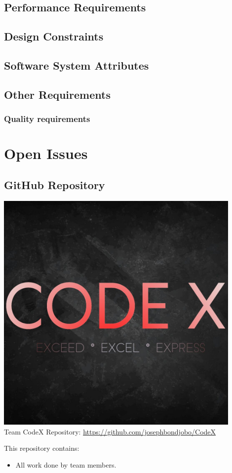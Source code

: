 \documentclass[a4paper,10pt]{article}
\begin{document}
	\subsection{Performance Requirements}

	\subsection{Design Constraints}

	\subsection{Software System Attributes}

	\subsection{Other Requirements}

\subsubsection{Quality requirements}

\clearpage

\section{Open Issues}
\subsection {GitHub Repository}
\includegraphics[width=12cm]{CodeX_logo.jpg} \\
Team CodeX Repository: \url{https://github.com/josephbondjobo/CodeX}

This repository contains:
\begin{itemize}
\item All work done by team members.
\end{itemize}



\newpage
\clearpage
{}
\end{document}
